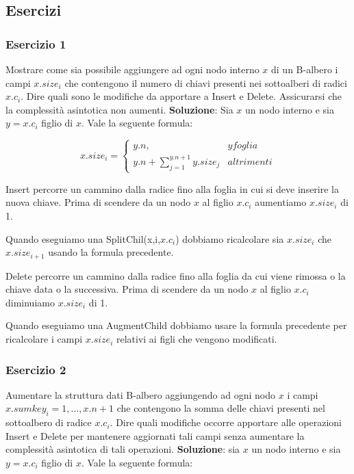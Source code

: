 \subsection{Esercizi}

\subsubsection{Esercizio 1}

Mostrare come sia possibile aggiungere ad ogni nodo interno $x$ di un B-albero i campi $x.size_i$ che contengono il numero di chiavi presenti nei sottoalberi di radici $x.c_i$. Dire quali sono le modifiche da apportare a Insert e Delete. Assicurarsi che la complessità asintotica non aumenti.
\linebreak
\linebreak
\textbf{Soluzione}: Sia $x$ un nodo interno e sia $y=x.c_i$ figlio di $x$. Vale la seguente formula:

$$
x.size_i=
\begin{cases}
y.n, & y foglia \\
y.n+\sum_{j=1}^{y.n+1}y.size_j & altrimenti
\end{cases}
$$

Insert percorre un cammino dalla radice fino alla foglia in cui si deve inserire la nuova chiave. Prima di scendere da un nodo $x$ al figlio $x.c_i$ aumentiamo $x.size_i$ di 1.

Quando eseguiamo una SplitChil(x,i,$x.c_i$) dobbiamo ricalcolare sia $x.size_i$ che $x.size_{i+1}$ usando la formula precedente.

Delete percorre un cammino dalla radice fino alla foglia da cui viene rimossa o la chiave data o la successiva. Prima di scendere da un nodo $x$ al figlio $x.c_i$ diminuiamo $x.size_i$ di 1.

Quando eseguiamo una AugmentChild dobbiamo usare la formula precedente per ricalcolare i campi $x.size_i$ relativi ai figli che vengono modificati.

\subsubsection{Esercizio 2}

Aumentare la struttura dati B-albero aggiungendo ad ogni nodo $x$ i campi $x.sumkey_i=1,...,x.n+1$ che contengono la somma delle chiavi presenti nel sottoalbero di radice $x.c_i$. Dire quali modifiche occorre apportare alle operazioni Insert e Delete per mantenere aggiornati tali campi senza aumentare la complessità asintotica di tali operazioni.
\linebreak
\linebreak
\textbf{Soluzione}: sia $x$ un nodo interno e sia $y=x.c_i$ figlio di $x$. Vale la seguente formula:

